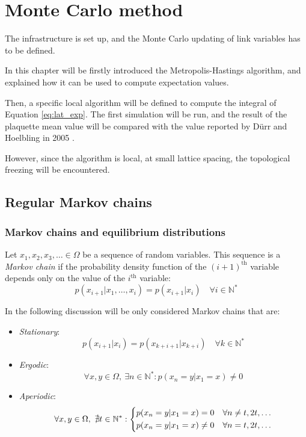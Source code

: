\chapter{Monte Carlo method}\label{ch:mc}

The infrastructure is set up, and the Monte Carlo updating of link variables has to be defined.

In this chapter will be firstly introduced the Metropolis-Hastings algorithm,
and explained how it can be used to compute expectation values.

Then, a specific local algorithm will be defined to compute the integral of Equation \eqref{eq:lat_exp}.
The first simulation will be run,
and the result of the plaquette mean value will be compared with the value reported by D\"urr and Hoelbling in 2005 \cite{durr-hoelbling:2005}.

However, since the algorithm is local, at small lattice spacing, the topological freezing will be encountered.

\section{Regular Markov chains}

\subsection*{Markov chains and equilibrium distributions}
Let $x_1, x_2, x_3, \ldots \in \Omega$ be a sequence of random variables.
This sequence is a \emph{Markov chain} if the probability density function of the $(i+1)^\mathrm{th}$
variable depends only on the value of the $i^\mathrm{th}$ variable:
\[
    p(x_{i+1}|x_1, \ldots, x_i) = p(x_{i+1}|x_i) \quad \forall i\in\mathbb N^*
\]

In the following discussion will be only considered Markov chains that are:
\begin{itemize}
    \item \emph{Stationary}:
        \[
            p(x_{i+1}|x_i) = p(x_{k+i+1}|x_{k+i}) \quad \forall k\in\mathbb N^*
        \]
    \item \emph{Ergodic}:
        \[
            \forall x,y \in \Omega,\ \exists n\in\mathbb N^* : p(x_n=y|x_1=x) \neq 0
        \]
    \item \emph{Aperiodic}:
        \[
            \forall x,y \in \Omega,\ \nexists t\in\mathbb N^* :
            \begin{dcases}
                p(x_n=y|x_1=x)=0 \quad \forall n\neq t,2t,\ldots \\
                p(x_n=y|x_1=x)\neq0 \quad \forall n=t,2t,\ldots
            \end{dcases}
        \]
\end{itemize}

